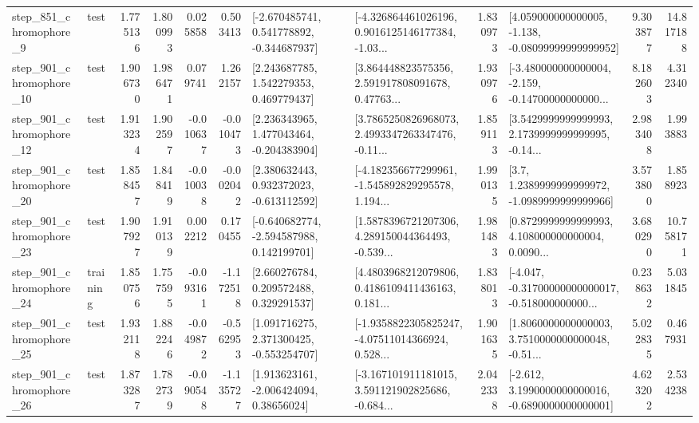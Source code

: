 \begin{tabular}{llrrrrllrlrr}
   step\_851\_chromophore\_9 &      test &      1.775136 &    1.800993 &      0.025858 &  0.503413 &   [-2.670485741, 0.541778892, -0.344687937] &  [-4.326864461026196, 0.9016125146177384, -1.03... &       1.830973 &  [4.059000000000005, -1.138, -0.08099999999999952] &            9.303877 &         14.817188 \\
  step\_901\_chromophore\_10 &      test &      1.906730 &    1.986471 &      0.079741 &  1.262157 &     [2.243687785, 1.542279353, 0.469779437] &  [3.864448823575356, 2.591917808091678, 0.47763... &       1.930976 &  [-3.480000000000004, -2.159, -0.14700000000000... &            8.182603 &          4.312340 \\
  step\_901\_chromophore\_12 &      test &      1.913234 &    1.902597 &     -0.010637 & -0.010473 &    [2.236343965, 1.477043464, -0.204383904] &  [3.7865250826968073, 2.4993347263347476, -0.11... &       1.859113 &  [3.5429999999999993, 2.1739999999999995, -0.14... &            2.983408 &          1.993883 \\
  step\_901\_chromophore\_20 &      test &      1.858457 &    1.848419 &     -0.010038 & -0.002042 &    [2.380632443, 0.932372023, -0.613112592] &  [-4.182356677299961, -1.545892829295578, 1.194... &       1.990135 &     [3.7, 1.2389999999999972, -1.0989999999999966] &            3.573800 &          1.858923 \\
  step\_901\_chromophore\_23 &      test &      1.907927 &    1.910139 &      0.002212 &  0.170455 &   [-0.640682774, -2.594587988, 0.142199701] &  [1.5878396721207306, 4.289150044364493, -0.539... &       1.981483 &  [0.8729999999999993, 4.108000000000004, 0.0090... &            3.680290 &         10.758171 \\
  step\_901\_chromophore\_24 &  training &      1.850756 &    1.757595 &     -0.093161 & -1.172518 &     [2.660276784, 0.209572488, 0.329291537] &  [4.4803968212079806, 0.4186109411436163, 0.181... &       1.838013 &  [-4.047, -0.31700000000000017, -0.518000000000... &            0.238632 &          5.031845 \\
  step\_901\_chromophore\_25 &      test &      1.932118 &    1.882246 &     -0.049872 & -0.562953 &    [1.091716275, 2.371300425, -0.553254707] &  [-1.9358822305825247, -4.07511014366924, 0.528... &       1.901635 &  [1.8060000000000003, 3.7510000000000048, -0.51... &            5.022835 &          0.467931 \\
  step\_901\_chromophore\_26 &      test &      1.873287 &    1.782739 &     -0.090548 & -1.135727 &     [1.913623161, -2.006424094, 0.38656024] &  [-3.167101911181015, 3.591121902825686, -0.684... &       2.042338 &  [-2.612, 3.1990000000000016, -0.6890000000000001] &            4.623202 &          2.534238 \\

\end{tabular}
